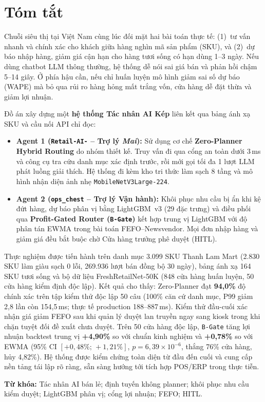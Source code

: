 \chapter*{Tóm tắt}

Chuỗi siêu thị tại Việt Nam cùng lúc đối mặt hai bài toán thực tế: (1)~tư vấn nhanh và chính xác cho khách giữa hàng nghìn mã sản phẩm (SKU), và (2)~dự báo nhập hàng, giảm giá cận hạn cho hàng tươi sống có hạn dùng 1--3 ngày. Nếu dùng chatbot LLM thông thường, hệ thống dễ nói sai giá bán và phản hồi chậm 5--14 giây. Ở phía hậu cần, nếu chỉ huấn luyện mô hình giảm sai số dự báo (WAPE) mà bỏ qua rủi ro hàng hỏng mất trắng vốn, cửa hàng dễ đặt thừa và giảm lợi nhuận.

Đồ án xây dựng một \textbf{hệ thống Tác nhân AI Kép} liên kết qua bảng ánh xạ SKU và cầu nối API chỉ đọc:
\begin{itemize}
    \item \textbf{Agent 1 (\texttt{Retail-AI-} -- Trợ lý \emph{Mai}):} Sử dụng cơ chế \textbf{Zero-Planner Hybrid Routing} do nhóm thiết kế. Truy vấn đi qua cổng an toàn dưới 3\,ms và công cụ tra cứu danh mục xác định trước, rồi mới gọi tối đa 1 lượt LLM phát luồng giải thích. Hệ thống đi kèm kho tri thức làm sạch 8 tầng và mô hình nhận diện ảnh nhẹ \texttt{MobileNetV3Large-224}.
    \item \textbf{Agent 2 (\texttt{ops\_chest} -- Trợ lý Vận hành):} Khôi phục nhu cầu bị ẩn khi kệ đứt hàng, dự báo phân vị bằng LightGBM~v3 (29 đặc trưng) và điều phối qua \textbf{Profit-Gated Router (\texttt{B-Gate})} kết hợp trung vị LightGBM với độ phân tán EWMA trong bài toán FEFO--Newsvendor. Mọi đơn nhập hàng và giảm giá đều bắt buộc chờ Cửa hàng trưởng phê duyệt (HITL).
\end{itemize}

Thực nghiệm được tiến hành trên danh mục 3.099 SKU Thanh Lam Mart (2.830 SKU làm giàu sạch 0 lỗi, 269.936 lượt bán đồng bộ 30 ngày), bảng ánh xạ 164 SKU tươi sống và bộ dữ liệu FreshRetailNet-50K (848 cửa hàng huấn luyện, 50 cửa hàng kiểm định độc lập). Kết quả cho thấy: Zero-Planner đạt \textbf{94,0\%} độ chính xác trên tập kiểm thử độc lập 50 câu (100\% căn cứ danh mục, P99 giảm 2,8 lần còn 154,5\,ms; thực tế production 188--887\,ms). Kiểm thử đầu-cuối xác nhận giá giảm FEFO sau khi quản lý duyệt lan truyền ngay sang kiosk trong khi chặn tuyệt đối đề xuất chưa duyệt. Trên 50 cửa hàng độc lập, \texttt{B-Gate} tăng lợi nhuận backtest trung vị \textbf{+4,90\%} so với chuẩn kinh nghiệm và \textbf{+0,78\%} so với EWMA (95\% CI $[+0{,}48\%;\,+1{,}21\%]$, $p=6{,}39\times 10^{-6}$, thắng 76\% cửa hàng, hủy 4,82\%). Hệ thống được kiểm chứng toàn diện từ đầu đến cuối và cung cấp nền tảng tái lập rõ ràng, sẵn sàng hướng tới tích hợp POS/ERP trong thực tiễn.

\vspace{0.5em}
\noindent\textbf{Từ khóa:} Tác nhân AI bán lẻ; định tuyến không planner; khôi phục nhu cầu kiểm duyệt; LightGBM phân vị; cổng lợi nhuận; FEFO; HITL.
